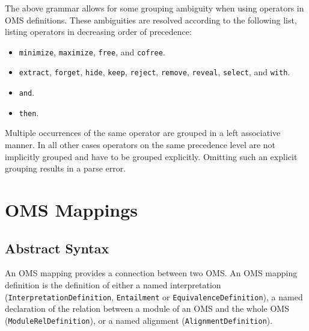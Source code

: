 \documentclass[10pt,fleqn,final]{scrreprt}
\newcommand*{\termref}[1]{\index{#1}#1\xspace}
\newcommand*{\syntax}[1]{\texttt{#1}}
\newcommand{\sclause}[1]{\section{#1}}
\newcommand{\ssclause}[1]{\subsection{#1}}
\newenvironment{definitions}[0]{\medskip }{}
\begin{document}
\begin{definitions}

The above grammar allows for some grouping ambiguity when using operators in
OMS definitions. These ambiguities are resolved according to the following
list, listing operators in decreasing order of precedence:
\begin{itemize}
  \item \syntax{minimize}, \syntax{maximize}, \syntax{free}, and \syntax{cofree}. 
  \item \syntax{extract}, \syntax{forget}, \syntax{hide}, \syntax{keep},
    \syntax{reject}, \syntax{remove}, \syntax{reveal}, \syntax{select}, and
    \syntax{with}.
  \item \syntax{and}.
  \item \syntax{then}.
\end{itemize}
Multiple occurrences of the same operator are grouped in a left associative
manner. In all other cases operators on the same precedence level are not
implicitly grouped and have to be grouped explicitly. Omitting such an explicit
grouping results in a parse error.




\sclause{OMS Mappings}\label{c:oms-mappings}
\ssclause{Abstract Syntax}


An OMS mapping provides a connection between two OMS. An OMS mapping definition is the definition of 
either a named interpretation (\syntax{InterpretationDefinition}, \syntax{Entailment} or 
\syntax{EquivalenceDefinition}), a named declaration of the  relation between a module of an OMS and the whole 
OMS (\syntax{ModuleRelDefinition}), or a named \termref{alignment} (\syntax{AlignmentDefinition}).


\end{definitions}
\end{document}
